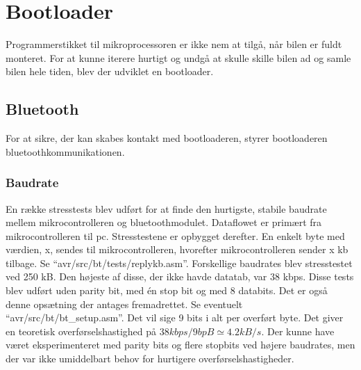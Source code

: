 \section{Bootloader}
Programmerstikket til mikroprocessoren er ikke nem at tilgå, når bilen er fuldt monteret. For at kunne iterere hurtigt og undgå at skulle skille bilen ad og samle bilen hele tiden, blev der udviklet en bootloader.

\subsection{Bluetooth}
For at sikre, der kan skabes kontakt med bootloaderen, styrer bootloaderen bluetoothkommunikationen.
\subsubsection{Baudrate}
En række stresstests blev udført for at finde den hurtigste, stabile baudrate mellem mikrocontrolleren og bluetoothmodulet. Dataflowet er primært fra mikrocontrolleren til pc. Stresstestene er opbygget derefter.
En enkelt byte med værdien, x, sendes til mikrocontrolleren, hvorefter mikrocontrolleren sender x kb tilbage.
Se ``avr/src/bt/tests/replykb.asm''.
Forskellige baudrates blev stresstestet ved 250 kB. Den højeste af disse, der ikke havde datatab, var 38 kbps. Disse tests blev udført uden parity bit, med én stop bit og med 8 databits. Det er også denne opsætning der antages fremadrettet. Se eventuelt ``avr/src/bt/bt\_setup.asm''. Det vil sige 9 bits i alt per overført byte. Det giver en teoretisk overførselshastighed på $38 kbps / 9 bpB \simeq 4.2 kB/s$. Der kunne have været eksperimenteret med parity bits og flere stopbits ved højere baudrates, men der var ikke umiddelbart behov for hurtigere overførselshastigheder.
